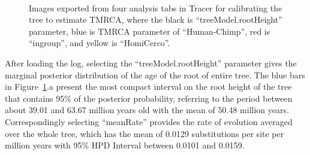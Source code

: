 \documentclass{bioinfo}
\begin{document}
\begin{figure}[ht]
\\
\caption{Images exported from four analysis tabs in Tracer for calibrating the tree to estimate TMRCA, where the black is ``treeModel.rootHeight'' parameter, blue is TMRCA parameter of ``Human-Chimp'', red is ``ingroup'', and yellow is ``HomiCerco''.}
\label{fig:4tabs}
\end{figure}

After loading the log, selecting the ``treeModel.rootHeight'' parameter gives the marginal posterior distribution of the age of the root of entire tree. The blue bars in Figure~\ref{fig:4tabs}.a present the most compact interval on the root height of the tree that contains 95\% of the posterior probability, referring to the period between about 39.01 and 63.67 million years old with the mean of 50.48 million years.
Correspondingly selecting ``meanRate'' provides the rate of evolution averaged over the whole tree, which has the mean of 0.0129 substitutions per site per million years with 95\% HPD Interval between 0.0101 and 0.0159.
\end{document}
